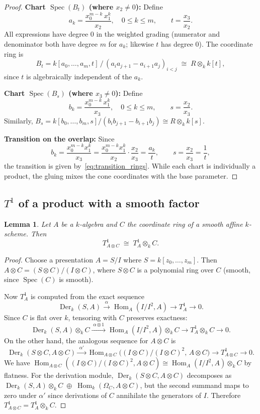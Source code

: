 \documentclass[11pt,twoside]{amsart}
\theoremstyle{plain}
\numberwithin{equation}{section}
\newtheorem{lemma}[theorem]{Lemma}
\DeclareMathOperator{\Spec}{Spec}
\DeclareMathOperator{\Der}{Der}
\theoremstyle{definition}
\newcommand{\Hom}{\operatorname{Hom}}
\begin{document}
\begin{proof}
\textbf{Chart $\Spec(B_t)$ (where $x_2 \neq 0$):} Define
\[
a_k = \frac{x_0^{m-k}\, x_1^k}{x_2}, \quad 0 \leq k \leq m, \qquad t = \frac{x_3}{x_2}.
\]
All expressions have degree $0$ in the weighted grading (numerator and denominator both have degree $m$ for $a_k$; likewise $t$ has degree $0$). The coordinate ring is
\[
B_t = k[a_0, \ldots, a_m, t] \,\big/\, (a_i a_{j+1} - a_{i+1} a_j)_{i < j} \;\cong\; R \otimes_k k[t],
\]
since $t$ is algebraically independent of the $a_k$.
 
\medskip
 
\textbf{Chart $\Spec(B_s)$ (where $x_3 \neq 0$):} Define
\[
b_k = \frac{x_0^{m-k}\, x_1^k}{x_3}, \quad 0 \leq k \leq m, \qquad s = \frac{x_2}{x_3}.
\]
Similarly, $B_s = k[b_0, \ldots, b_m, s] / (b_i b_{j+1} - b_{i+1} b_j) \cong R \otimes_k k[s]$.
 
\medskip
 
\textbf{Transition on the overlap:} Since
\[
b_k = \frac{x_0^{m-k}x_1^k}{x_3} = \frac{x_0^{m-k}x_1^k}{x_2} \cdot \frac{x_2}{x_3} = \frac{a_k}{t}, \qquad s = \frac{x_2}{x_3} = \frac{1}{t},
\]
the transition is given by~\eqref{eq:transition_rings}. While each chart is individually a product, the gluing mixes the cone coordinates with the base parameter.
\end{proof}
 
\subsection{$T^1$ of a product with a smooth factor}
 
\begin{lemma}\label{lem:product}
Let $A$ be a $k$-algebra and $C$ the coordinate ring of a smooth affine $k$-scheme. Then
\[
T^1_{A \otimes C} \;\cong\; T^1_A \otimes_k C.
\]
\end{lemma}
 
\begin{proof}
Choose a presentation $A = S/I$ where $S = k[z_0, \ldots, z_m]$. Then $A \otimes C = (S \otimes C)/(I \otimes C)$, where $S \otimes C$ is a polynomial ring over $C$ (smooth, since $\Spec(C)$ is smooth).
 
Now $T^1_A$ is computed from the exact sequence
\[
\Der_k(S, A) \xrightarrow{\;\alpha\;} \Hom_A(I/I^2, A) \to T^1_A \to 0.
\]
Since $C$ is flat over $k$, tensoring with $C$ preserves exactness:
\[
\Der_k(S, A) \otimes_k C \xrightarrow{\;\alpha \otimes 1\;} \Hom_A(I/I^2, A) \otimes_k C \to T^1_A \otimes_k C \to 0.
\]
On the other hand, the analogous sequence for $A \otimes C$ is
\[
\Der_k(S \otimes C, A \otimes C) \xrightarrow{\;\alpha'\;} \Hom_{A \otimes C}\!\big((I \otimes C)/(I \otimes C)^2,\, A \otimes C\big) \to T^1_{A \otimes C} \to 0.
\]
We have $\Hom_{A \otimes C}((I \otimes C)/(I \otimes C)^2, A \otimes C) \cong \Hom_A(I/I^2, A) \otimes_k C$ by flatness. For the derivation module, $\Der_k(S \otimes C, A \otimes C)$ decomposes as $\Der_k(S, A) \otimes_k C \;\oplus\; \Hom_k(\Omega_C, A \otimes C)$, but the second summand maps to zero under $\alpha'$ since derivations of $C$ annihilate the generators of $I$. Therefore $T^1_{A \otimes C} = T^1_A \otimes_k C$.
\end{proof}
 
\end{document}
